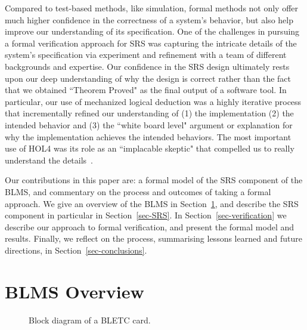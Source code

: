 \documentclass{llncs}
\begin{document}
Compared to test-based methods, like simulation, formal methods not only offer much higher confidence in the correctness of a system's behavior, but also help improve our understanding of its specification.
One of the challenges in pursuing a formal verification approach for SRS was capturing the intricate details of the system's specification via experiment and refinement with a team of different backgrounds and expertise.
Our confidence in the SRS design ultimately rests upon our deep understanding of why the design is correct rather than the fact that we obtained ``Theorem Proved" as the final output of a software tool.
In particular, our use of mechanized logical deduction was a highly iterative process that incrementally refined our understanding of (1) the implementation (2) the intended behavior and (3) the ``white board level" argument or explanation for why the implementation achieves the intended behaviors.
The most important use of HOL4  was its role as an ``implacable skeptic" that compelled us to really understand the details~\cite{rushby}.

Our contributions in this paper are: a formal model of the SRS component of the BLMS, and commentary on the process and outcomes of taking a formal approach.
We give an overview of the BLMS in Section~\ref{sec-BLM}, and describe the SRS component in particular in Section~\ref{sec-SRS}.
In Section~\ref{sec-verification} we describe our approach to formal verification, and present the formal model and results.
Finally, we reflect on the process, summarising lessons learned and future directions, in Section~\ref{sec-conclusions}.

\section{BLMS Overview}
\label{sec-BLM}

\begin{figure}[t]
  \centering  {}
   \caption{Block diagram of a BLETC card.}
  \label{fig:BLETC}
\end{figure}
\end{document}
